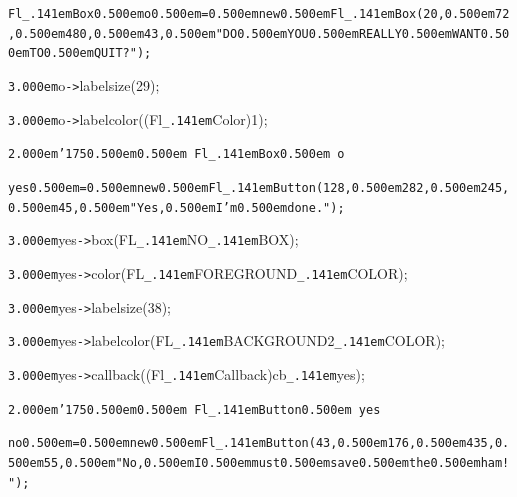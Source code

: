 \documentclass[12pt]{article}
\begin{document}
\noindent
\tt{}Fl{\tt\_\kern.141em}Box{\tt *}{\tt\mc \kern0.500em}o{\tt\mc \kern0.500em}={\tt\mc \kern0.500em}new{\tt\mc \kern0.500em}Fl{\tt\_\kern.141em}Box(20,{\tt\mc \kern0.500em}72,{\tt\mc \kern0.500em}480,{\tt\mc \kern0.500em}43,{\tt\mc \kern0.500em}{\tt "}DO{\tt\mc \kern0.500em}YOU{\tt\mc \kern0.500em}REALLY{\tt\mc \kern0.500em}WANT{\tt\mc \kern0.500em}TO{\tt\mc \kern0.500em}QUIT?{\tt "});

\noindent
{}{\tt\mc \kern3.000em}o{\tt -}{\tt >}labelsize(29);

\noindent
{}{\tt\mc \kern3.000em}o{\tt -}{\tt >}labelcolor((Fl{\tt\_\kern.141em}Color)1);

\noindent
{}{\tt\mc \kern2.000em}{\tt\char'175}{\tt\mc \kern0.500em}\tt\mc {\tt /}{\tt /}\kern0.500em Fl{\tt\_\kern.141em}Box{\tt *}\kern0.500em o

\noindent
\tt{}yes{\tt\mc \kern0.500em}={\tt\mc \kern0.500em}new{\tt\mc \kern0.500em}Fl{\tt\_\kern.141em}Button(128,{\tt\mc \kern0.500em}282,{\tt\mc \kern0.500em}245,{\tt\mc \kern0.500em}45,{\tt\mc \kern0.500em}{\tt "}Yes,{\tt\mc \kern0.500em}I{\tt{}}'m{\tt\mc \kern0.500em}done.{\tt "});

\noindent
{}{\tt\mc \kern3.000em}yes{\tt -}{\tt >}box(FL{\tt\_\kern.141em}NO{\tt\_\kern.141em}BOX);

\noindent
{}{\tt\mc \kern3.000em}yes{\tt -}{\tt >}color(FL{\tt\_\kern.141em}FOREGROUND{\tt\_\kern.141em}COLOR);

\noindent
{}{\tt\mc \kern3.000em}yes{\tt -}{\tt >}labelsize(38);

\noindent
{}{\tt\mc \kern3.000em}yes{\tt -}{\tt >}labelcolor(FL{\tt\_\kern.141em}BACKGROUND2{\tt\_\kern.141em}COLOR);

\noindent
{}{\tt\mc \kern3.000em}yes{\tt -}{\tt >}callback((Fl{\tt\_\kern.141em}Callback{\tt *})cb{\tt\_\kern.141em}yes);

\noindent
{}{\tt\mc \kern2.000em}{\tt\char'175}{\tt\mc \kern0.500em}\tt\mc {\tt /}{\tt /}\kern0.500em Fl{\tt\_\kern.141em}Button{\tt *}\kern0.500em yes

\noindent
\tt{}no{\tt\mc \kern0.500em}={\tt\mc \kern0.500em}new{\tt\mc \kern0.500em}Fl{\tt\_\kern.141em}Button(43,{\tt\mc \kern0.500em}176,{\tt\mc \kern0.500em}435,{\tt\mc \kern0.500em}55,{\tt\mc \kern0.500em}{\tt "}No,{\tt\mc \kern0.500em}I{\tt\mc \kern0.500em}must{\tt\mc \kern0.500em}save{\tt\mc \kern0.500em}the{\tt\mc \kern0.500em}ham!{\tt "});
\end{document}
